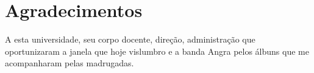 \chapter*{Agradecimentos}

A esta universidade, seu corpo docente, direção, administração que oportunizaram a janela que hoje vislumbro e a banda Angra pelos álbuns que me acompanharam pelas madrugadas.